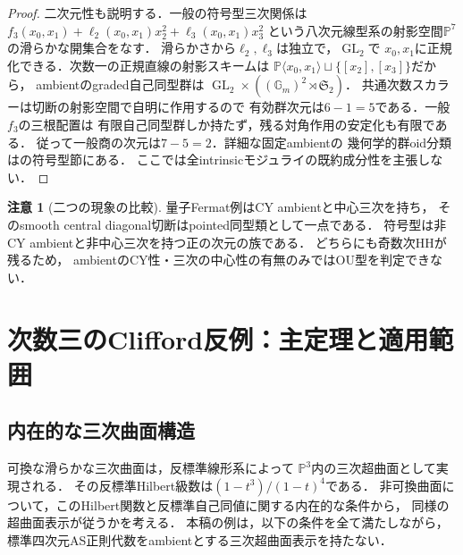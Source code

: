 \documentclass[11pt,a4paper]{ltjsarticle}
\theoremstyle{definition}
\newtheorem{remark}[theorem]{注意}
\begin{document}
\begin{proof}
二次元性も説明する．一般の符号型三次関係は
$f_3(x_0,x_1)+\ell_2(x_0,x_1)x_2^2+\ell_3(x_0,x_1)x_3^2$
という八次元線型系の射影空間$\mathbb P^7$の滑らかな開集合をなす．
滑らかさから$\ell_2,\ell_3$は独立で，$\operatorname{GL}_2$で
$x_0,x_1$に正規化できる．次数一の正規直線の射影スキームは
$\mathbb P\langle x_0,x_1\rangle\sqcup\{[x_2],[x_3]\}$だから，
ambientのgraded自己同型群は
$\operatorname{GL}_2\times((\mathbb G_m)^2\rtimes\mathfrak S_2)$．
共通次数スカラーは切断の射影空間で自明に作用するので
有効群次元は$6-1=5$である．一般$f_3$の三根配置は
有限自己同型群しか持たず，残る対角作用の安定化も有限である．
従って一般商の次元は$7-5=2$．詳細な固定ambientの
幾何学的群oid分類は\cite{Current}の符号型節にある．
ここでは全intrinsicモジュライの既約成分性を主張しない．
\end{proof}

\begin{remark}[二つの現象の比較]
量子Fermat例はCY ambientと中心三次を持ち，
そのsmooth central diagonal切断はpointed同型類として一点である．
符号型は非CY ambientと非中心三次を持つ正の次元の族である．
どちらにも奇数次HHが残るため，
ambientのCY性・三次の中心性の有無のみではOU型を判定できない．
\end{remark}


\section{次数三のClifford反例：主定理と適用範囲}
\label{sec:introduction}

\subsection{内在的な三次曲面構造}

可換な滑らかな三次曲面は，反標準線形系によって
$\mathbb P^3$内の三次超曲面として実現される．
その反標準Hilbert級数は$(1-t^3)/(1-t)^4$である．
非可換曲面について，このHilbert関数と反標準自己同値に関する内在的な条件から，
同様の超曲面表示が従うかを考える．
本稿の例は，以下の条件を全て満たしながら，
標準四次元AS正則代数をambientとする三次超曲面表示を持たない．
\end{document}
